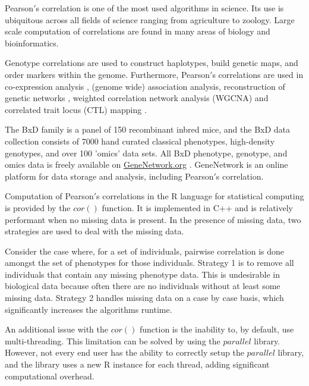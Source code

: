 \documentclass{bioinfo}
\begin{document}

\enlargethispage{12pt}

Pearson$'$s correlation is one of the most used algorithms in
science. Its use is ubiquitous across all fields of science ranging
from agriculture to zoology. Large scale computation of correlations
are found in many areas of biology and bioinformatics.

Genotype correlations are used to construct haplotypes, build genetic
maps, and order markers within the genome. Furthermore, Pearson$'$s
correlations are used in co-expression analysis \citep{Tesson:2010},
(genome wide) association analysis, reconstruction of genetic
networks \citep{Fukushima:2013}, weighted correlation network analysis
(WGCNA) \citep{Horvath:2008} and correlated trait locus (CTL)
mapping \citep{Arends2016a}.

The BxD family is a panel of 150 recombinant inbred mice, and the BxD
data collection consists of 7000 hand curated classical phenotypes,
high-density genotypes, and over 100 'omics' data sets. All BxD
phenotype, genotype, and omics data is freely available on
\href{https://genenetwork.org/}{GeneNetwork.org} \citep{Sloan2016}.
GeneNetwork is an online platform for data storage and analysis,
including Pearson$'$s correlation.

Computation of Pearson$'$s correlations in the R language for
statistical computing \citep{R:2005} is provided by the $cor()$
function. It is implemented in C++ and is relatively performant when
no missing data is present. In the presence of missing data, two
strategies are used to deal with the missing data.

Consider the case where, for a set of individuals, pairwise
correlation is done amongst the set of phenotypes for those
individuals. Strategy 1 is to remove all individuals that contain any
missing phenotype data. This is undesirable in biological data because
often there are no individuals without at least some missing
data. Strategy 2 handles missing data on a case by case basis, which
significantly increases the algorithms runtime.

An additional issue with the $cor()$ function is the inability to, by
default, use multi-threading. This limitation can be solved by using
the $parallel$ library.  However, not every end user has the ability
to correctly setup the $parallel$ library, and the library uses a new
R instance for each thread, adding significant computational overhead.
\vspace*{-5mm}
\end{document}
